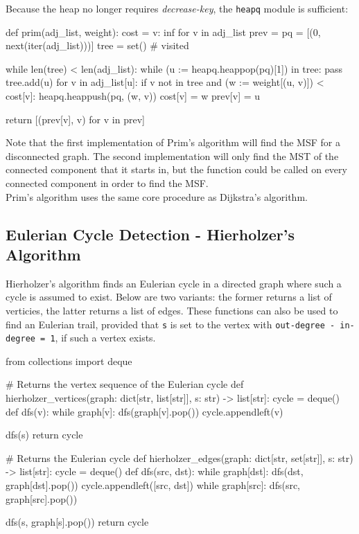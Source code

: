 \documentclass[12pt, titlepage]{article}
\begin{document}
Because the heap no longer requires \textit{decrease-key}, the \texttt{heapq} module is sufficient: \medskip

\begin{python}
def prim(adj_list, weight):
    cost = {v: inf for v in adj_list}
    prev = {}
    pq = [(0, next(iter(adj_list)))]
    tree = set()  # visited

    while len(tree) < len(adj_list):
        while (u := heapq.heappop(pq)[1]) in tree: pass
        tree.add(u)
        for v in adj_list[u]:
            if v not in tree and (w := weight[(u, v)]) < cost[v]:
                heapq.heappush(pq, (w, v))
                cost[v] = w
                prev[v] = u
        
    return [(prev[v], v) for v in prev]
\end{python}

Note that the first implementation of Prim's algorithm will find the MSF for a disconnected graph. The second implementation will only find the MST of the connected component that it starts in, but the function could be called on every connected component in order to find the MSF. \\

Prim's algorithm uses the same core procedure as Dijkstra's algorithm.

\subsection{Eulerian Cycle Detection - Hierholzer's Algorithm} \label{hierholzer}

Hierholzer's algorithm finds an Eulerian cycle in a directed graph where such a cycle is assumed to exist. Below are two variants: the former returns a list of verticies, the latter returns a list of edges. These functions can also be used to find an Eulerian trail, provided that \texttt{s} is set to the vertex with \texttt{out-degree - in-degree = 1}, if such a vertex exists. \medskip

\begin{python}
from collections import deque

# Returns the vertex sequence of the Eulerian cycle
def hierholzer_vertices(graph: dict[str, list[str]], s: str) -> list[str]:
    cycle = deque()
    def dfs(v):
        while graph[v]:
            dfs(graph[v].pop())
        cycle.appendleft(v)

    dfs(s)
    return cycle


# Returns the Eulerian cycle
def hierholzer_edges(graph: dict[str, set[str]], s: str) -> list[str]:
    cycle = deque()
    def dfs(src, dst):
        while graph[dst]:
            dfs(dst, graph[dst].pop())
        cycle.appendleft([src, dst])
        while graph[src]:
            dfs(src, graph[src].pop())

    dfs(s, graph[s].pop())
    return cycle
\end{python}
\end{document}
